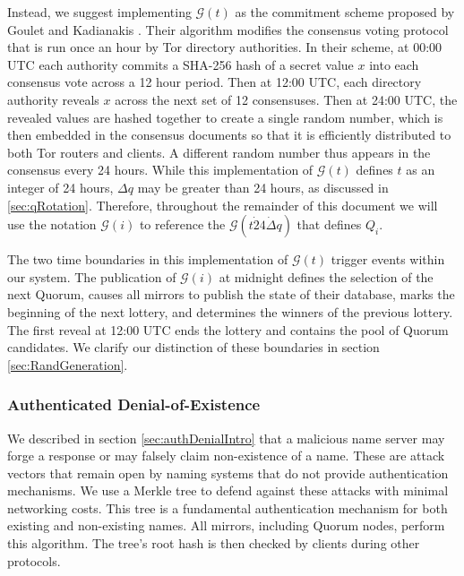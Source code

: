 \documentclass[USenglish,oneside,twocolumn]{article}
\begin{document}
Instead, we suggest implementing $ \mathcal{G}(t) $ as the commitment scheme proposed by Goulet and Kadianakis \cite{GouletCommitReveal}. Their algorithm modifies the consensus voting protocol that is run once an hour by Tor directory authorities. In their scheme, at 00:00 UTC each authority commits a SHA-256 hash of a secret value $ x $ into each consensus vote across a 12 hour period. Then at 12:00 UTC, each directory authority reveals $ x $ across the next set of 12 consensuses. Then at 24:00 UTC, the revealed values are hashed together to create a single random number, which is then embedded in the consensus documents so that it is efficiently distributed to both Tor routers and clients. A different random number thus appears in the consensus every 24 hours. While this implementation of $ \mathcal{G}(t) $ defines $ t $ as an integer of 24 hours, $ \Delta q $ may be greater than 24 hours, as discussed in \ref{sec:qRotation}. Therefore, throughout the remainder of this document we will use the notation $ \mathcal{G}(i) $ to reference the $ \mathcal{G}(t \dot 24 \dot \Delta q) $ that defines $ Q_{i} $.


The two time boundaries in this implementation of $ \mathcal{G}(t) $ trigger events within our system. The publication of $ \mathcal{G}(i) $ at midnight defines the selection of the next Quorum, causes all mirrors to publish the state of their database, marks the beginning of the next lottery, and determines the winners of the previous lottery. The first reveal at 12:00 UTC ends the lottery and contains the pool of Quorum candidates. We clarify our distinction of these boundaries in section \ref{sec:RandGeneration}. 


\subsubsection{Authenticated Denial-of-Existence}
\label{sec:authDenial}

We described in section \ref{sec:authDenialIntro} that a malicious name server may forge a response or may falsely claim non-existence of a name. These are attack vectors that remain open by naming systems that do not provide authentication mechanisms. We use a Merkle tree \cite{merkle1988digital} to defend against these attacks with minimal networking costs. This tree is a fundamental authentication mechanism for both existing and non-existing names. All mirrors, including Quorum nodes, perform this algorithm. The tree's root hash is then checked by clients during other protocols.
\end{document}

